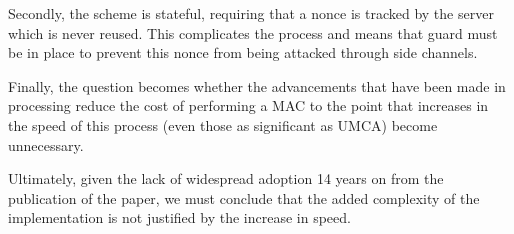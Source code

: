 \documentclass[10pt]{article} %
\begin{document}
Secondly, the scheme is stateful, requiring that a nonce is tracked by the
server which is never reused. This complicates the process and means that guard
must be in place to prevent this nonce from being attacked through side channels.

Finally, the question becomes whether the advancements that have been made in
processing reduce the cost of performing a MAC to the point that increases in
the speed of this process (even those as significant as UMCA) become
unnecessary.

Ultimately, given the lack of widespread adoption 14 years on from the
publication of the paper, we must conclude that the added complexity of the
implementation is not justified by the increase in speed.


\end{document}
